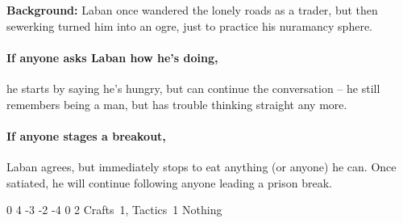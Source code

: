 
\textbf{Background:}
Laban once wandered the lonely roads as a trader, but then \Gls{sewerking} turned him into an ogre, just to practice his nuramancy sphere.

\paragraph{If anyone asks Laban how he's doing,}
he starts by saying he's hungry, but can continue the conversation -- he still remembers being a man, but has trouble thinking straight any more.

\paragraph{If anyone stages a breakout,}
Laban agrees, but immediately stops to eat anything (or anyone) he can.
Once satiated, he will continue following anyone leading a prison break.


  {0}%
  {4}%
  {{-3}%
  {-2}%
  {-4}}%
  {0}%
  {2}%
  {Crafts~1, Tactics~1}%
  {Nothing}%
  {}

